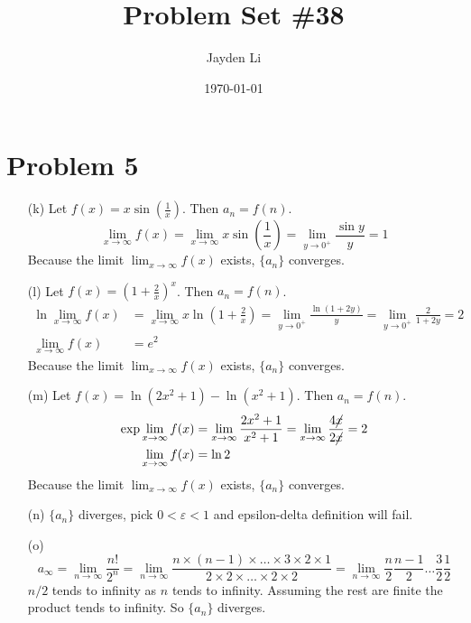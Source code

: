 \documentclass[preview, margin=0.6in]{standalone}
\title{\vspace*{-30pt}Problem Set \#38}
\author{Jayden Li}
\date{\today}
\newcommand*{\problem}[1]{\section*{Problem #1}}
\begin{document}
\fontsize{12pt}{12pt}\selectfont
\setlength{\abovedisplayskip}{0pt}
\setlength{\parindent}{0pt}
\setlength{\parskip}{2ex plus 0.5ex minus 0.2ex}
\maketitle

\problem{5}
\begin{itemize}
	\item[(k)]
		Let $\displaystyle f(x)=x\sin \left(\frac 1x\right)$. Then $a_n=f(n)$.
		\begin{equation*}
		    \lim_{x\to\infty}f(x)=\lim_{x\to\infty}x\sin \left(\frac 1x\right)=\lim_{y\to 0^+}\frac{\sin y}{y}=1
		\end{equation*}
		Because the limit $\lim_{x\to\infty}f(x)$ exists, $\{a_n\}$ converges.

	\item[(l)]
		Let $\displaystyle f(x)=\left(1+\frac{2}{x}\right)^x$. Then $a_n=f(n)$.
		\begin{align*}
			\ln \lim_{x\to\infty}f(x)&=\lim_{x\to\infty}x\ln\left(1+\frac 2x\right)=\lim_{y\to 0^+}\frac{\ln(1+2y)}{y}=\lim_{y\to0^+}\frac{2}{1+2y}=2 \\
			\lim_{x\to\infty}f(x)&=e^2
		\end{align*}
		Because the limit $\lim_{x\to\infty}f(x)$ exists, $\{a_n\}$ converges.

	\item[(m)]
		Let $\displaystyle f(x)=\ln \left(2x^2+1\right)-\ln\left(x^2+1\right)$. Then $a_n=f(n)$.
		\begin{align*}
			\exp \lim_{x\to\infty}f(x)&=\lim_{x\to\infty}\frac{2x^2+1}{x^2+1}=\lim_{x\to\infty}\frac{4\cancel x}{2\cancel x}=2 \\
			\lim_{x\to\infty}f(x)&=\ln2
		\end{align*}
		Because the limit $\lim_{x\to\infty}f(x)$ exists, $\{a_n\}$ converges.

	\item[(n)]
		$\{a_n\}$ diverges, pick $0<\varepsilon<1$ and epsilon-delta definition will fail.

	\item[(o)]
		\begin{equation*}
			a_{\infty}=\lim_{n\to\infty}\frac{n!}{2^n}=\lim_{n\to\infty}\frac{n\times(n-1)\times\ldots\times3\times2\times1}{2\times2\times\ldots\times2\times2}=\lim_{n\to\infty}\frac{n}{2}\frac{n-1}{2}\ldots \frac{3}{2}\frac{1}{2}
		\end{equation*}
		$n/2$ tends to infinity as $n$ tends to infinity. Assuming the rest are finite the product tends to infinity. So $\{a_n\}$ diverges.
\end{itemize}
\end{document}
